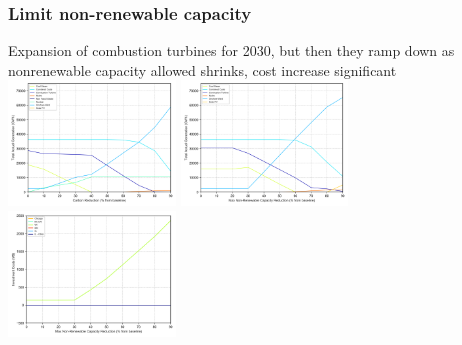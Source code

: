 \documentclass[xcolor=dvipsnames]{beamer}
\begin{document}
%
%


\begin{frame}
  \frametitle{Limit non-renewable capacity}
  Expansion of combustion turbines for 2030, but then they ramp down
  as nonrenewable capacity allowed shrinks, cost increase significant\\
  \includegraphics[width=0.333\textwidth]{includes/no_leakage_shutdowns_agg_generation_cntlreg.png}
  \includegraphics[width=0.333\textwidth]{includes/no_leakage_maxNR_agg_generation_cntlreg.png}
  \includegraphics[width=0.333\textwidth]{includes/no_leakage_maxNR_invest_costs_by_region.png}


\end{frame}
\end{document}
